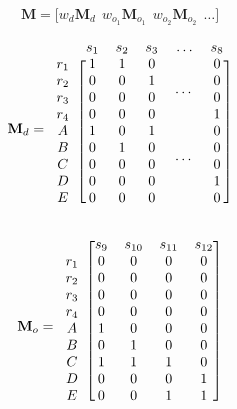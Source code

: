 \begin{equation}\label{eq:horzcat}
\mathbf{M} = \bigg[w_d\mathbf{M}_d ~~ w_{o_1}\mathbf{M}_{o_1} ~~ w_{o_2}\mathbf{M}_{o_2} ~~ \dots\bigg]
\end{equation}
\begin{minipage}[c]{0.5\textwidth}\centering
\begin{equation}\label{eq:Md}
\mathbf{M}_d=\begin{blockarray}{cccccc}
                  ~     &  s_1  &  s_2  &  s_3  & \dots &  s_8  \cr
            \begin{block}{c[ccccc]}
                 r_1    &   1   &   1   &   0   &\multirow{4}{*}{\dots} &   0   \cr
                 r_2    &   0   &   0   &   1   &       &   0   \cr
                 r_3    &   0   &   0   &   0   &       &   0   \cr
                 r_4    &   0   &   0   &   0   &       &   1   \cr
                  A     &   1   &   0   &   1   &\multirow{4}{*}{\dots} &   0   \cr
                  B     &   0   &   1   &   0   &       &   0   \cr
                  C     &   0   &   0   &   0   &       &   0   \cr
                  D     &   0   &   0   &   0   &       &   1   \cr
                  E     &   0   &   0   &   0   &       &   0   \cr
            \end{block}
        \end{blockarray}
\end{equation}
\end{minipage}
\begin{minipage}[c]{0.5\textwidth}\centering
\begin{equation}\label{eq:Mo}
\mathbf{M}_o=\begin{blockarray}{ccccc}
            \begin{block}{c[cccc]}
                  ~     &  s_9  & s_{10}& s_{11}& s_{12}\cr
                 r_1    &   0   &   0   &   0   &   0   \cr
                 r_2    &   0   &   0   &   0   &   0   \cr
                 r_3    &   0   &   0   &   0   &   0   \cr
                 r_4    &   0   &   0   &   0   &   0   \cr
                  A     &   1   &   0   &   0   &   0   \cr
                  B     &   0   &   1   &   0   &   0   \cr
                  C     &   1   &   1   &   1   &   0   \cr
                  D     &   0   &   0   &   0   &   1   \cr
                  E     &   0   &   0   &   1   &   1   \cr
            \end{block}
        \end{blockarray}
\end{equation}
\end{minipage}


